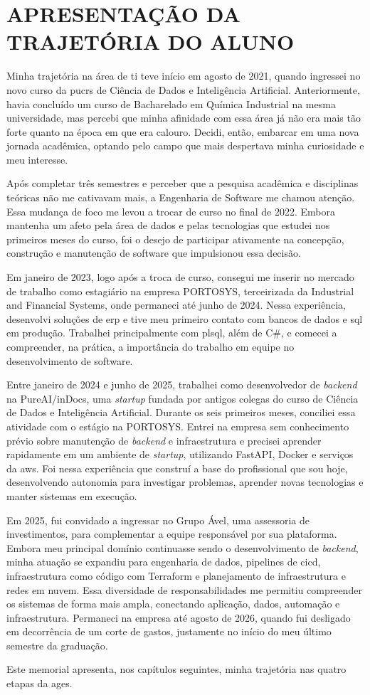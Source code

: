 \chapter[APRESENTAÇÃO DA TRAJETÓRIA DO ALUNO]{APRESENTAÇÃO DA TRAJETÓRIA DO ALUNO}

Minha trajetória na área de \ac{ti} teve início em agosto de 2021, quando ingressei no novo curso da \ac{pucrs} de Ciência de Dados e Inteligência Artificial. Anteriormente, havia concluído um curso de Bacharelado em Química Industrial na mesma universidade, mas percebi que minha afinidade com essa área já não era mais tão forte quanto na época em que era calouro. Decidi, então, embarcar em uma nova jornada acadêmica, optando pelo campo que mais despertava minha curiosidade e meu interesse.

Após completar três semestres e perceber que a pesquisa acadêmica e
disciplinas teóricas não me cativavam mais, a Engenharia de Software me chamou atenção. Essa mudança de foco me levou a trocar de curso no final de 2022. Embora mantenha um afeto pela área de dados e pelas tecnologias que estudei nos primeiros meses do curso, foi o desejo de participar ativamente na concepção, construção e manutenção de software que impulsionou essa decisão.

Em janeiro de 2023, logo após a troca de curso, consegui me inserir no mercado de
trabalho como estagiário na empresa PORTOSYS, terceirizada da Industrial and
Financial Systems, onde permaneci até junho de 2024. Nessa experiência,
desenvolvi soluções de \ac{erp} e tive meu primeiro contato com bancos de dados e
\ac{sql} em produção. Trabalhei principalmente com \ac{plsql}, além de C\#, e
comecei a compreender, na prática, a importância do trabalho em equipe no
desenvolvimento de software.

Entre janeiro de 2024 e junho de 2025, trabalhei como desenvolvedor de
\textit{backend} na PureAI/inDocs, uma \textit{startup} fundada por antigos
colegas do curso de Ciência de Dados e Inteligência Artificial. Durante os seis
primeiros meses, conciliei essa atividade com o estágio na PORTOSYS. Entrei na
empresa sem conhecimento prévio sobre manutenção de \textit{backend} e
infraestrutura e precisei aprender rapidamente em um ambiente de \textit{startup},
utilizando FastAPI, Docker e serviços da \ac{aws}. Foi nessa experiência que
construí a base do profissional que sou hoje, desenvolvendo autonomia para
investigar problemas, aprender novas tecnologias e manter sistemas em execução.

Em 2025, fui convidado a ingressar no Grupo Ável, uma assessoria de investimentos,
para complementar a equipe responsável por sua plataforma. Embora meu principal
domínio continuasse sendo o desenvolvimento de \textit{backend}, minha atuação se
expandiu para engenharia de dados, pipelines de \ac{cicd}, infraestrutura como
código com Terraform \cite{terraform} e planejamento de infraestrutura e redes em
nuvem. Essa diversidade de responsabilidades me permitiu compreender os sistemas
de forma mais ampla, conectando aplicação, dados, automação e infraestrutura.
Permaneci na empresa até agosto de 2026, quando fui desligado em decorrência de
um corte de gastos, justamente no início do meu último semestre da graduação.

Este memorial apresenta, nos capítulos seguintes, minha trajetória nas quatro etapas da \ac{ages}.
